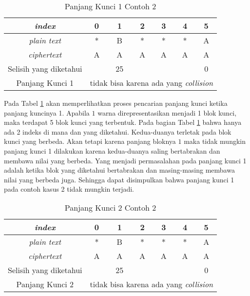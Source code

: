 	\begin{table}[H]
	 	\centering
	 	\caption{Panjang Kunci 1 Contoh 2}
	 	\setlength{\arrayrulewidth}{.08em}
	 	\begin{tabular}{|c|c|c|c|c|c|c|}\hline
		\textit{index}&0&1&2&3&4&5\\ \hline
	 	\textit{plain text}&\cellcolor{blue!15}*&\cellcolor{yellow!25}B&\cellcolor{green!15}*&\cellcolor{lime!25}*&\cellcolor{pink!30}*&\cellcolor{red!25}A\\ \hline
	 	\textit{ciphertext}&\cellcolor{blue!15}A&\cellcolor{yellow!25}A&\cellcolor{green!15}A&\cellcolor{lime!25}A&\cellcolor{pink!30}A&\cellcolor{red!25}A\\ \hline
	 	Selisih yang diketahui& &25& & & &0\\ \hline
	 	Panjang Kunci 1 & \multicolumn{6}{c|}{tidak bisa karena ada yang \textit{collision}}\\ \hline
	 	\end{tabular}
	 	\label{tab:k1contoh2}
	\end{table}	
	
	Pada Tabel \ref{tab:k1contoh2} akan memperlihatkan proses pencarian panjang kunci ketika panjang kuncinya 1. Apabila $1$ warna direpresentasikan menjadi 1 blok kunci, maka terdapat 5 blok kunci yang terbentuk. Pada bagian Tabel \ref{tab:k1contoh2} bahwa hanya ada 2 indeks di mana \plaintext dan \ciphertext yang diketahui. Kedua-duanya terletak pada blok kunci yang berbeda. Akan tetapi karena panjang bloknya $1$ maka tidak mungkin panjang kunci 1 dilakukan karena kedua-duanya saling bertabrakan dan membawa nilai yang berbeda. Yang menjadi permasalahan pada panjang kunci 1 adalah ketika blok yang diketahui bertabrakan dan masing-masing membawa nilai yang berbeda juga. Sehingga dapat disimpulkan bahwa panjang kunci 1 pada contoh kasus 2 tidak mungkin terjadi.
	\\
	
	\begin{table}[H]
	 	\centering
	 	\caption{Panjang Kunci 2 Contoh 2}
	 	\setlength{\arrayrulewidth}{.08em}
	 	\begin{tabular}{|c|c|c|c|c|c|c|}\hline
		\textit{index}&0&1&2&3&4&5\\ \hline
	 	\textit{plain text}&\cellcolor{blue!15}*&\cellcolor{blue!15}B&\cellcolor{green!15}*&\cellcolor{green!15}*&\cellcolor{pink!30}*&\cellcolor{pink!30}A\\ \hline
	 	\textit{ciphertext}&\cellcolor{blue!15}A&\cellcolor{blue!15}A&\cellcolor{green!15}A&\cellcolor{green!15}A&\cellcolor{pink!30}A&\cellcolor{pink!30}A\\ \hline
	 	Selisih yang diketahui& &25& & & &0\\ \hline
	 	Panjang Kunci 2 & \multicolumn{6}{c|}{tidak bisa karena ada yang \textit{collision}}\\ \hline
	 	\end{tabular}
	 	\label{tab:k2contoh2}
	\end{table}	
	
